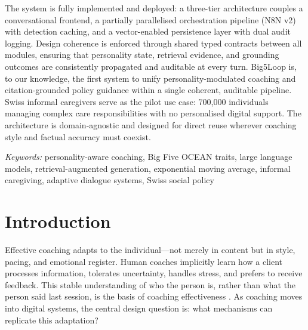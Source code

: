 \documentclass[10pt,a4paper]{report}
\newcommand{\keywords}[1]{\par\vspace{0.5em}\noindent\textit{Keywords:} #1}
\begin{document}
The system is fully implemented and deployed: a three-tier architecture couples a conversational frontend, a partially parallelised orchestration pipeline (N8N v2) with detection caching, and a vector-enabled persistence layer with dual audit logging. Design coherence is enforced through shared typed contracts between all modules, ensuring that personality state, retrieval evidence, and grounding outcomes are consistently propagated and auditable at every turn. Big5Loop is, to our knowledge, the first system to unify personality-modulated coaching and citation-grounded policy guidance within a single coherent, auditable pipeline. Swiss informal caregivers serve as the pilot use case: 700,000 individuals managing complex care responsibilities with no personalised digital support. The architecture is domain-agnostic and designed for direct reuse wherever coaching style and factual accuracy must coexist.

\keywords{personality-aware coaching, Big Five OCEAN traits, large language models, retrieval-augmented generation, exponential moving average, informal caregiving, adaptive dialogue systems, Swiss social policy}

\tableofcontents

\clearpage
\setcounter{page}{1}

\chapter{Introduction}
\label{ch:intro}

Effective coaching adapts to the individual---not merely in content but in style, pacing, and emotional register. Human coaches implicitly learn how a client processes information, tolerates uncertainty, handles stress, and prefers to receive feedback. This stable understanding of who the person is, rather than what the person said last session, is the basis of coaching effectiveness \citep{Grant2003, Stober2006}. As coaching moves into digital systems, the central design question is: what mechanisms can replicate this adaptation?
\end{document}
